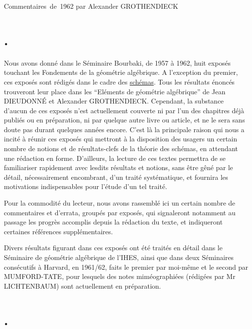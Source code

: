\unit{Commentaires de 1962}
%
  {par Alexander GROTHENDIECK}

\section*{\normalfont{}.}

Nous avons donné dans le Séminaire Bourbaki, de 1957 à 1962, huit exposés
touchant les Fondements de la géométrie algébrique. A l'exception du premier,
ces exposés sont rédigés dans le cadre des \uline{schémas}. Tous les résultats énoncés
trouveront leur place dans les ``Eléments de géométrie algébrique'' de Jean
DIEUDONNÉ et Alexander GROTHENDIECK. Cependant, la substance d'aucun de ces
exposés n'est actuellement couverte ni par l'un des chapitres déjà publiés ou
en préparation, ni par quelque autre livre ou article, et ne le sera sans doute
pas durant quelques années encore. C'est là la principale raison qui nous a
incité à réunir ces exposés qui mettront à la disposition des usagers un certain
nombre de notions et de résultats-clefs de la théorie des schémas, en attendant
une rédaction en forme. D'ailleurs, la lecture de ces textes permettra de se
familiariser rapidement avec lesdits résultats et notions, sans être gêné par
le détail, nécessairement encombrant, d'un traité systématique, et fournira les
motivations indispensables pour l'étude d'un tel traité.

Pour la commodité du lecteur, nous avons rassemblé ici un certain nombre de
commentaires et d'errata, groupés par exposés, qui signaleront notamment au
passage les progrès accomplis depuis la rédaction du texte, et indiqueront
certaines références supplémentaires.

Divers résultats figurant dans ces exposés ont été traités en détail dans le
Séminaire de géométrie algébrique de l'IHES, ainsi que dans deux Séminaires
consécutifs à Harvard, en 1961/62, faits le premier par moi-même et le second
par MUMFORD-TATE, pour lesquels des notes miméographiées (rédigées par Mr
LICHTENBAUM) sont actuellement en préparation.

\section*{\normalfont{}.}

